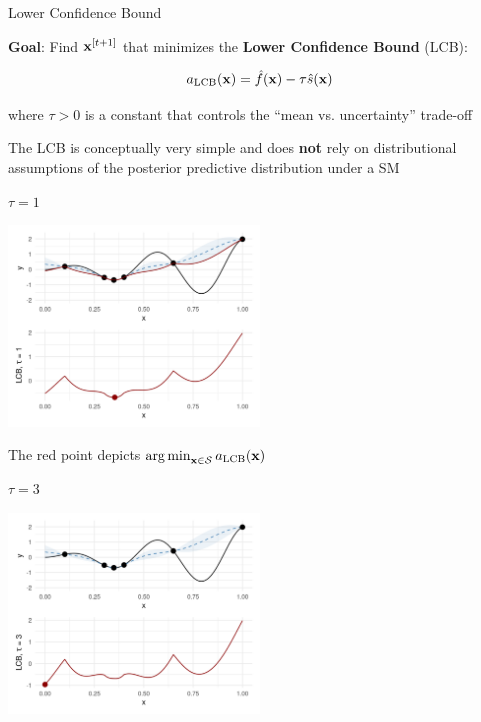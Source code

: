 \documentclass[11pt,compress,t,notes=noshow, xcolor=table]{beamer}
\begin{document}
\begin{vbframe}{Lower Confidence Bound}

\textbf{Goal}: Find $\mathbf{x}^{[t+1]}$ that minimizes the \textbf{Lower Confidence Bound} (LCB):

$$
  a_{\text{LCB}}(\mathbf{x}) = \hat{f}(\mathbf{x}) - \tau \hat{s}(\mathbf{x})
$$

where $\tau > 0$ is a constant that controls the \enquote{mean vs. uncertainty} trade-off\\

\vspace{1em}

The LCB is conceptually very simple and does \textbf{not} rely on distributional assumptions of the posterior predictive distribution under a SM

\framebreak

$\tau = 1$

\begin{center}
  \includegraphics[width = 0.5\textwidth]{figure_man/bayesian_loop_lcb_0.png}
\end{center}

The red point depicts $\operatorname{arg\,min}_{\mathbf{x} \in \mathcal{S}} a_{\text{LCB}}(\mathbf{x})$

\framebreak

$\tau = 3$

\begin{center}
  \includegraphics[width = 0.5\textwidth]{figure_man/bayesian_loop_lcb_1.png}
\end{center}


\end{vbframe}
\end{document}

